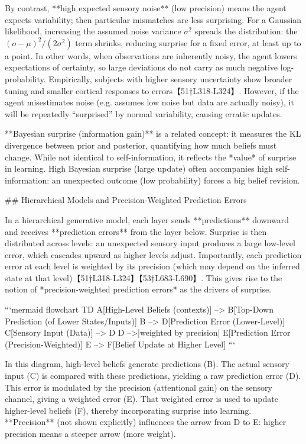 \documentclass[a4paper]{article}
\begin{document}
    By contrast, **high expected sensory noise** (low precision) means the agent expects variability; then particular mismatches are less surprising.  For a Gaussian likelihood, increasing the assumed noise variance \(\sigma^2\) spreads the distribution: the \((o-\mu)^2/(2\sigma^2)\) term shrinks, reducing surprise for a fixed error, at least up to a point.  In other words, when observations are inherently noisy, the agent lowers expectations of certainty, so large deviations do not carry as much negative log-probability.  Empirically, subjects with higher sensory uncertainty show broader tuning and smaller cortical responses to errors【51†L318-L324】. However, if the agent misestimates noise (e.g. assumes low noise but data are actually noisy), it will be repeatedly “surprised” by normal variability, causing erratic updates.
    
    **Bayesian surprise (information gain)** is a related concept: it measures the KL divergence between prior and posterior, quantifying how much beliefs must change.  While not identical to self-information, it reflects the *value* of surprise in learning.  High Bayesian surprise (large update) often accompanies high self-information: an unexpected outcome (low probability) forces a big belief revision.
    
    ## Hierarchical Models and Precision-Weighted Prediction Errors
    
    In a hierarchical generative model, each layer sends **predictions** downward and receives **prediction errors** from the layer below.  Surprise is then distributed across levels: an unexpected sensory input produces a large low-level error, which cascades upward as higher levels adjust.  Importantly, each prediction error at each level is weighted by its precision (which may depend on the inferred state at that level)【51†L318-L324】【53†L683-L690】.  This gives rise to the notion of *precision-weighted prediction errors* as the drivers of surprise.
    
    ```mermaid
    flowchart TD
        A[High-Level Beliefs (contexts)] --> B[Top-Down Prediction \n(of Lower States/Inputs)]
        B --> D[Prediction Error \n(Lower-Level)]
        C[Sensory Input (Data)] --> D
        D -->|weighted by precision| E[Prediction Error (Precision-Weighted)]
        E --> F[Belief Update at Higher Level]
    ```
    
    In this diagram, high-level beliefs generate predictions (B).  The actual sensory input (C) is compared with these predictions, yielding a raw prediction error (D).  This error is modulated by the precision (attentional gain) on the sensory channel, giving a weighted error (E).  That weighted error is used to update higher-level beliefs (F), thereby incorporating surprise into learning.  **Precision** (not shown explicitly) influences the arrow from D to E: higher precision means a steeper arrow (more weight).
    
\end{document}

